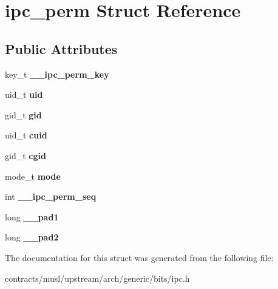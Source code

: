 \hypertarget{structipc__perm}{}\section{ipc\+\_\+perm Struct Reference}
\label{structipc__perm}
\subsection*{Public Attributes}
\begin{DoxyCompactItemize}
\item 
\mbox{\label{structipc__perm_a1c617959f19f3b09e36ea24807151942}} 
key\+\_\+t {\bfseries \+\_\+\+\_\+ipc\+\_\+perm\+\_\+key}
\item 
\mbox{\label{structipc__perm_af7cfffc0f428ebbde9fb19b73d2ba7b5}} 
uid\+\_\+t {\bfseries uid}
\item 
\mbox{\label{structipc__perm_af340f116f3b1bb3fd7ba8c02815d0da1}} 
gid\+\_\+t {\bfseries gid}
\item 
\mbox{\label{structipc__perm_ae9d42dc0bc6e79354ac6830e534338a4}} 
uid\+\_\+t {\bfseries cuid}
\item 
\mbox{\label{structipc__perm_a1501ad9c5a481e39cfc3814ad5810dc7}} 
gid\+\_\+t {\bfseries cgid}
\item 
\mbox{\label{structipc__perm_ab949b2a2f2358f7d0771d32dc96b1563}} 
mode\+\_\+t {\bfseries mode}
\item 
\mbox{\label{structipc__perm_a1bfa644eea578aead7c26c692fac84b4}} 
int {\bfseries \+\_\+\+\_\+ipc\+\_\+perm\+\_\+seq}
\item 
\mbox{\label{structipc__perm_a8bb9cb1d1039e910b14cc696332448c2}} 
long {\bfseries \+\_\+\+\_\+pad1}
\item 
\mbox{\label{structipc__perm_a459041ddc5d6b984a7d619455400700e}} 
long {\bfseries \+\_\+\+\_\+pad2}
\end{DoxyCompactItemize}


The documentation for this struct was generated from the following file\+:\begin{DoxyCompactItemize}
\item 
contracts/musl/upstream/arch/generic/bits/ipc.\+h\end{DoxyCompactItemize}
